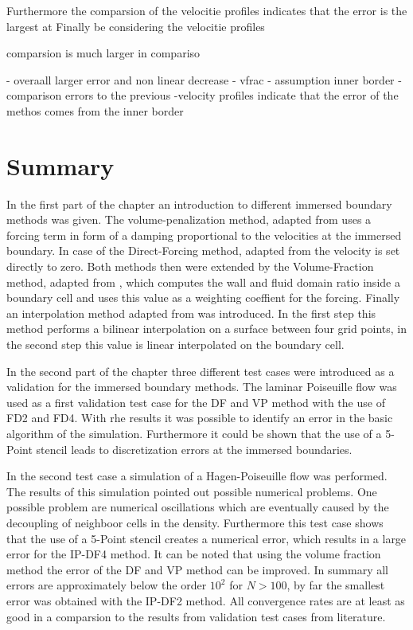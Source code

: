 Furthermore the comparsion of the velocitie profiles indicates that the error is the largest at
Finally be considering the velocitie profiles

comparsion is much larger in compariso

- overaall larger error and non linear decrease
- vfrac
- assumption inner border
-comparison errors to the previous
-velocity profiles indicate that the error of the methos  comes from the inner border

\clearpage

\section{Summary}

In the first part of the chapter an introduction to different immersed boundary methods was given.
The volume-penalization method, adapted from  \citep{Lulff2011} uses a forcing term in form of a damping proportional to the velocities at the immersed boundary.
In case of the Direct-Forcing method, adapted from \citep{Fadlun2000} the velocity is set directly to zero.
Both methods then were extended by the Volume-Fraction method, adapted from \citep{Fadlun2000}, which computes the wall and fluid domain ratio inside a boundary
cell and uses this value as a weighting coeffient for the forcing.
Finally an interpolation method adapted from  \citep{ Gilmanov2003} was introduced. In the first step this method performs a bilinear interpolation on a  surface
between four grid points, in the second step this value is linear interpolated on the boundary cell.

In the second part of the chapter three different test cases were introduced as a validation for the immersed boundary methods.
The laminar Poiseuille flow was used as a first validation test case for the DF and VP method with the use of FD2 and FD4.
With rhe results it was possible to identify an error in the basic algorithm of the simulation.
Furthermore it could be shown that the use of a 5-Point stencil leads to discretization errors at the immersed boundaries.

In the second test case a simulation of a Hagen-Poiseuille flow was performed.
The results of this simulation pointed out possible numerical problems.
One possible problem are numerical oscillations which are eventually caused
by the decoupling of neighboor cells in the density.
Furthermore this test case shows that the use of a 5-Point stencil creates a numerical error,
which results in a large error for the IP-DF4 method.
It can be noted that using the volume fraction method  the error of the DF and VP method can be improved.
In summary all errors are approximately below the order  $10^2$ for $N>100$,
by far the smallest error was obtained with the IP-DF2 method.
All convergence rates are at least as good in a comparsion
to the results from validation test cases from literature.

